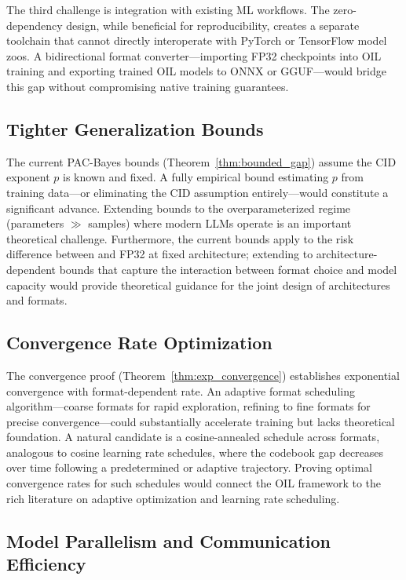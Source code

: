The third challenge is integration with existing ML workflows. The zero-dependency design, while beneficial for reproducibility, creates a separate toolchain that cannot directly interoperate with PyTorch or TensorFlow model zoos. A bidirectional format converter---importing FP32 checkpoints into OIL training and exporting trained OIL models to ONNX or GGUF---would bridge this gap without compromising native training guarantees.

\subsection{Tighter Generalization Bounds}

The current PAC-Bayes bounds (Theorem~\ref{thm:bounded_gap}) assume the CID exponent $p$ is known and fixed. A fully empirical bound estimating $p$ from training data---or eliminating the CID assumption entirely---would constitute a significant advance. Extending bounds to the overparameterized regime (parameters $\gg$ samples) where modern LLMs operate is an important theoretical challenge. Furthermore, the current bounds apply to the risk difference between \OIL{} and FP32 at fixed architecture; extending to architecture-dependent bounds that capture the interaction between format choice and model capacity would provide theoretical guidance for the joint design of architectures and formats.

\subsection{Convergence Rate Optimization}

The convergence proof (Theorem~\ref{thm:exp_convergence}) establishes exponential convergence with format-dependent rate. An adaptive format scheduling algorithm---coarse formats for rapid exploration, refining to fine formats for precise convergence---could substantially accelerate training but lacks theoretical foundation. A natural candidate is a cosine-annealed schedule across formats, analogous to cosine learning rate schedules, where the codebook gap decreases over time following a predetermined or adaptive trajectory. Proving optimal convergence rates for such schedules would connect the OIL framework to the rich literature on adaptive optimization and learning rate scheduling.

\subsection{Model Parallelism and Communication Efficiency}

